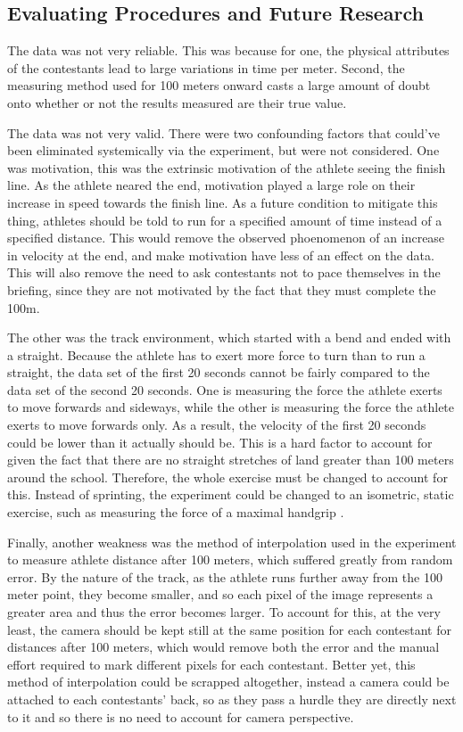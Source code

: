 \documentclass[index]{subfiles}
\begin{document}
\subsection{Evaluating Procedures and Future Research}

The data was not very reliable. This was because for one, the physical attributes of the contestants lead to large variations in time per meter. Second, the measuring method used for 100 meters onward casts a large amount of doubt onto whether or not the results measured are their true value.

The data was not very valid. There were two confounding factors that could've been eliminated systemically via the experiment, but were not considered. One was motivation, this was the extrinsic motivation of the athlete seeing the finish line. As the athlete neared the end, motivation played a large role on their increase in speed towards the finish line. As a future condition to mitigate this thing, athletes should be told to run for a specified amount of time instead of a specified distance. This would remove the observed phoenomenon of an increase in velocity at the end, and make motivation have less of an effect on the data. This will also remove the need to ask contestants not to pace themselves in the briefing, since they are not motivated by the fact that they must complete the 100m.

The other was the track environment, which started with a bend and ended with a straight. Because the athlete has to exert more force to turn than to run a straight, the data set of the first 20 seconds cannot be fairly compared to the data set of the second 20 seconds. One is measuring the force the athlete exerts to move forwards and sideways, while the other is measuring the force the athlete exerts to move forwards only. As a result, the velocity of the first 20 seconds could be lower than it actually should be. This is a hard factor to account for given the fact that there are no straight stretches of land greater than 100 meters around the school. Therefore, the whole exercise must be changed to account for this. Instead of sprinting, the experiment could be changed to an isometric, static exercise, such as measuring the force of a maximal handgrip \parencite{kurosawaCreatineSupplementationEnhances2003}.

Finally, another weakness was the method of interpolation used in the experiment to measure athlete distance after 100 meters, which suffered greatly from random error. By the nature of the track, as the athlete runs further away from the 100 meter point, they become smaller, and so each pixel of the image represents a greater area and thus the error becomes larger. To account for this, at the very least, the camera should be kept still at the same position for each contestant for distances after 100 meters, which would remove both the error and the manual effort required to mark different pixels for each contestant. Better yet, this method of interpolation could be scrapped altogether, instead a camera could be attached to each contestants' back, so as they pass a hurdle they are directly next to it and so there is no need to account for camera perspective.
\end{document}
